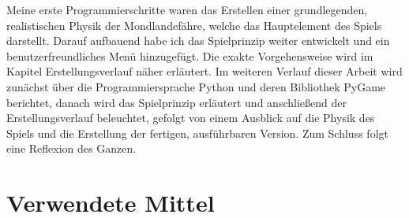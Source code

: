 \documentclass[hidelinks]{article}
\begin{document}
Meine erste Programmierschritte waren das Erstellen einer grundlegenden, realistischen Physik der Mondlandefähre, welche das Hauptelement des Spiels darstellt. Darauf aufbauend habe ich das Spielprinzip weiter entwickelt und ein benutzerfreundliches Menü hinzugefügt. Die exakte Vorgehensweise wird im Kapitel Erstellungsverlauf näher erläutert.
Im weiteren Verlauf dieser Arbeit wird zunächst über die Programmiersprache Python und deren Bibliothek PyGame berichtet, danach wird das Spielprinzip erläutert und anschließend der Erstellungsverlauf beleuchtet, gefolgt von einem Ausblick auf die Physik des Spiels und die Erstellung der fertigen, ausführbaren Version. Zum Schluss folgt eine Reflexion des Ganzen.
\section{Verwendete Mittel}
\end{document}
